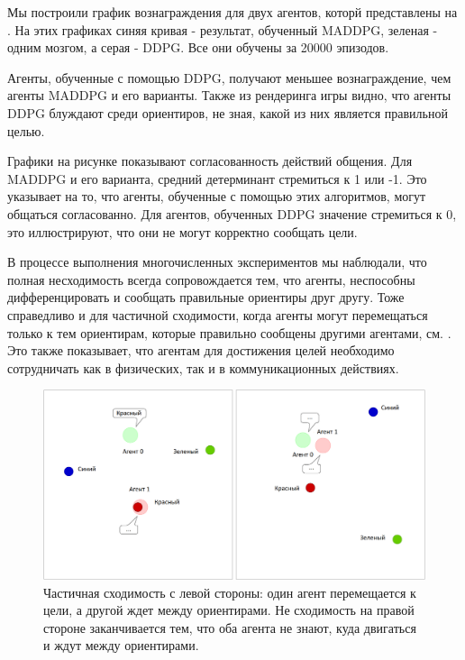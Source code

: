 Мы построили график вознаграждения для двух агентов, которй представлены на . На этих графиках синяя кривая - результат, обученный MADDPG, зеленая - одним мозгом, а серая - DDPG. Все они обучены за 20000 эпизодов.

Агенты, обученные с помощью DDPG, получают меньшее вознаграждение, чем агенты MADDPG и его варианты. Также из рендеринга игры видно, что агенты DDPG блуждают среди ориентиров, не зная, какой из них является правильной целью.

Графики на рисунке  показывают согласованность действий общения. Для MADDPG и его варианта, средний детерминант стремиться к 1 или -1. Это указывает на то, что агенты, обученные с помощью этих алгоритмов, могут общаться согласованно. Для агентов, обученных DDPG значение стремиться к 0, это иллюстрируют, что они не могут корректно сообщать цели.

В процессе выполнения многочисленных экспериментов мы наблюдали, что полная несходимость всегда сопровождается тем, что агенты, неспособны дифференцировать и сообщать правильные ориентиры друг другу. Тоже справедливо и для частичной сходимости, когда агенты могут перемещаться только к тем ориентирам, которые правильно сообщены другими агентами, см. . Это также показывает, что агентам для достижения целей необходимо сотрудничать как в физических, так и в коммуникационных действиях.

\begin{figure}[ht!]
	\center
	\includegraphics [scale=0.45] {my_folder/images/ch5/results-sr-non-convergency.png}
	\caption{Частичная сходимость с левой стороны: один агент перемещается к цели, а другой ждет между ориентирами. Не сходимость на правой стороне заканчивается тем, что оба агента не знают, куда двигаться и ждут между ориентирами.}
	\label{fig:result-sr-non-convergency}
\end{figure}

